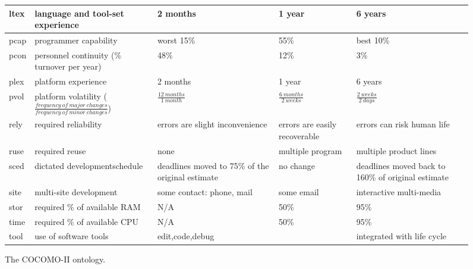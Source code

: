 \begin{figure*}
\begin{changed}
{\begin{center}
\begin{tabular}{|p{0.5in}|p{1.4in}|p{1.3in}|p{1.3in}|p{1.3in}|}
ltex   &  language and tool-set experience   & 2 months  &  1
year & 6 years \\\hline

pcap   &  programmer capability  &  worst 15\%   & 55\%  &  best 10\% \\\hline


pcon   &  personnel continuity \newline
(\% turnover per year) &
    48\% &    12\%  & 3\% \\\hline

plex   &  platform experience  &  2 months  &  1 year  &  6 years\\\hline


pvol   &  platform volatility  ($\frac{frequency~of~major~changes}{frequency~of~minor~changes}$) &
$\frac{12~months}{1~month}$   & $\frac{6~months}{2~weeks}$ &
$\frac{2~weeks}{2~days}$\\\hline



rely   &  required
reliability &   errors are slight inconvenience  &  errors are easily
recoverable   & errors can risk human life\\\hline




ruse   &  required
reuse &   none &    multiple program  & multiple product lines\\\hline

sced  &   dictated development\newline schedule &    deadlines moved to
75\% of the original estimate &  no change
&  deadlines moved back to  160\% of original estimate\\\hline

site   &  multi-site development   & some contact: phone, mail&
some email  &  interactive multi-media\\\hline

stor  &   required \% of available
RAM & N/A
 &   50\% &  95\% \\\hline


time  &   required \% of available CPU &
N/A&     50\%
   &  95\% \\\hline


tool   &  use of software tools  &  edit,code,debug &&
integrated with life cycle\\\hline
\end{tabular}
\end{center}}

\caption{The COCOMO-II ontology.}
\label{fig:cocont}
\end{changed}
\end{figure*}
